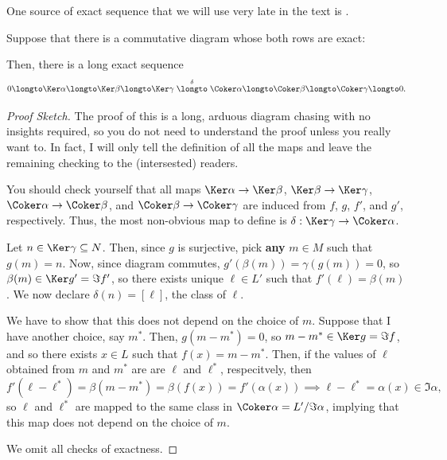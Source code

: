 One source of exact sequence that we will use
very late in the text is .
\begin{lemma}
\label{lem:snake}
Suppose that there is a commutative diagram 
whose both rows are exact:
\begin{center}
\end{center}
Then, there is a long exact sequence 
$$0 \longto \Ker\alpha \longto \Ker\beta 
\longto \Ker\gamma \stackrel\delta\longto \Coker\alpha 
\longto \Coker\beta \longto \Coker\gamma\longto 0.$$
\end{lemma}
\begin{proof}[Proof Sketch]
The proof of this is a long, arduous diagram chasing
with no insights required,
so you do not need to understand the proof
unless you really want to.
In fact, I will only tell the definition of all the maps
and leave the remaining checking to the (intersested) readers.

You should check yourself that all maps
$\Ker\alpha\to\Ker\beta$, $\Ker\beta\to\Ker\gamma$,
$\Coker\alpha\to\Coker\beta$, and $\Coker\beta\to\Coker\gamma$
are induced from $f$, $g$, $f'$, and $g'$, respectively.
Thus, the most non-obvious map to define is 
$\delta : \Ker\gamma \to \Coker\alpha$.

Let $n\in\Ker\gamma\subseteq N$.
Then, since $g$ is surjective, pick \textbf{any}
$m\in M$ such that $g(m)=n$.
Now, since diagram commutes, $g'(\beta(m)) = \gamma(g(m))
= 0$, so $\beta(m)\in \Ker g' = \Im f'$,
so there exists unique $\ell\in L'$ such that 
$f'(\ell) = \beta(m)$. We now declare 
$\delta(n) = [\ell]$, the class of $\ell$.

We have to show that this does not depend on the choice of
$m$. Suppose that I have another choice,
say $m^*$. Then, $g(m-m^*) = 0$, 
so $m-m^*\in\Ker g = \Im f$,
and so there exists $x\in L$ such that $f(x)=m-m^*$.
Then, if the values of $\ell$ obtained from $m$ and $m^*$ are
are $\ell$ and $\ell^*$, respecitvely, then
$$f'(\ell - \ell^*) = \beta(m-m^*)
= \beta(f(x)) = f'(\alpha(x))
\implies \ell-\ell^* = \alpha(x)\in \Im\alpha,$$
so $\ell$ and $\ell^*$ are mapped to the same class
in $\Coker\alpha = L'/\Im\alpha$,
implying that this map does not depend on the choice of $m$.

We omit all checks of exactness.
\end{proof}
%
%
%
%
%
